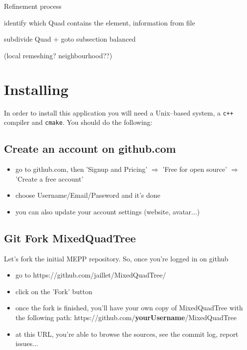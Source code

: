 \documentclass[10pt]{article}
\begin{document}
\begin{algorithm}[H]
\SetAlgoLined
{}
 \caption{Refinement process}
\end{algorithm}

identify which Quad contains the element, information from file

subdivide Quad + goto subsection balanced

(local remeshing? neighbourhood??)


\section{Installing}
\label{install}

In order to install this application you will need a Unix--based system, a \texttt{c++} compiler and \texttt{cmake}. You should do the following:

\subsection{Create an account on github.com}

\begin{itemize}
\item go to github.com, then 'Signup and Pricing' $\Rightarrow$ 'Free for open source' $\Rightarrow$ 'Create a free account'
\item choose Username/Email/Password and it's done
\item you can also update your account settings (website, avatar...)
\end {itemize}

\subsection{Git Fork MixedQuadTree}

Let's fork the initial MEPP repository. So, once you're logged in on github
\begin{itemize}
\item go to https://github.com/jaillet/MixedQuadTree/
\item click on the 'Fork' button
\item once the fork is finished, you'll have your own copy of MixedQuadTree with the following path: https://github.com/\textbf{yourUsername}/MixedQuadTree
\item at this URL, you're able to browse the sources, see the commit log, report issues...
\end {itemize}
\end{document}
